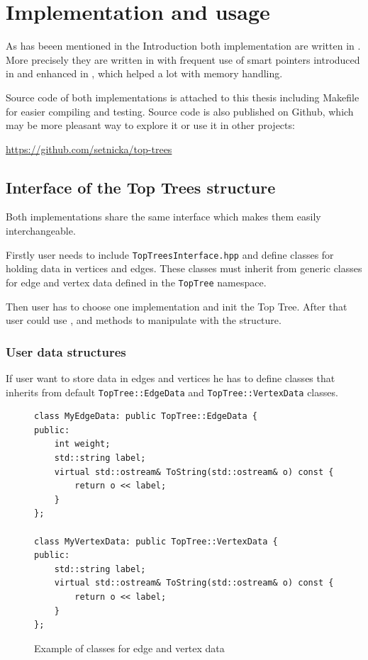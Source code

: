 \chapter{Implementation and usage}
\label{chap:Implementation}

As has beeen mentioned in the Introduction both implementation are written in
\Cpp. More precisely they are written in  with frequent use of smart
pointers introduced in  and enhanced in , which helped a lot with
memory handling.

Source code of both implementations is attached to this thesis including
Makefile for easier compiling and testing. Source code is also published on
Github, which may be more pleasant way to explore it or use it in other
projects:

\bigskip
\centerline{\url{https://github.com/setnicka/top-trees}}
\bigskip

\section{Interface of the Top Trees structure}

Both implementations share the same interface which makes them easily
interchangeable.

Firstly user needs to include \texttt{TopTreesInterface.hpp} and define classes
for holding data in vertices and edges. These classes must inherit from generic
classes for edge and vertex data defined in the \texttt{TopTree} namespace.

Then user has to choose one implementation and init the Top Tree. After that
user could use \Cut, \Link{} and \Expose{} methods to manipulate with the structure.

\subsection{User data structures}

If user want to store data in edges and vertices he has to define classes that
inherits from default \texttt{TopTree::EdgeData} and \texttt{TopTree::VertexData}
classes.

\begin{figure}[H]
\begin{verbatim}
class MyEdgeData: public TopTree::EdgeData {
public:
    int weight;
    std::string label;
    virtual std::ostream& ToString(std::ostream& o) const {
        return o << label;
    }
};

class MyVertexData: public TopTree::VertexData {
public:
    std::string label;
    virtual std::ostream& ToString(std::ostream& o) const {
        return o << label;
    }
};
\end{verbatim}
\caption{Example of classes for edge and vertex data}
\end{figure}

